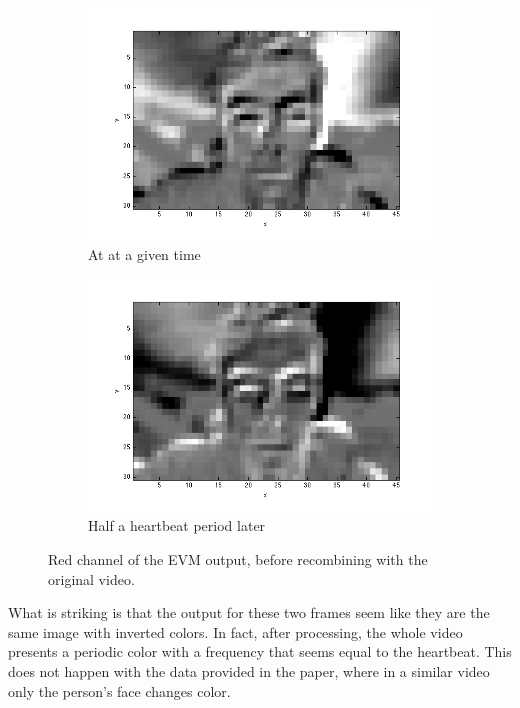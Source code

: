 \documentclass[12pt]{article}
\begin{document}
  \begin{figure}
    \begin{subfigure}{.5\textwidth}
      \captionsetup{justification=centering}
      \includegraphics[width=\textwidth]{images/red_peak.png}
      \caption{At at a given time}
    \end{subfigure}
    \begin{subfigure}{.5\textwidth}
      \captionsetup{justification=centering}
      \includegraphics[width=\textwidth]{images/red_trough.png}
      \caption{Half a heartbeat period later}
    \end{subfigure}
    \captionsetup{justification=centering}
    \caption{Red channel of the EVM output, before recombining with the original video.}
  \end{figure}

  What is striking is that the output for these two frames seem like they are the same image with inverted colors. In fact, after processing, the whole video presents a 
  periodic color with a frequency that seems equal to the heartbeat. This does not happen with the data provided in the paper, where in a similar video only the person's face 
  changes color.
\end{document}
